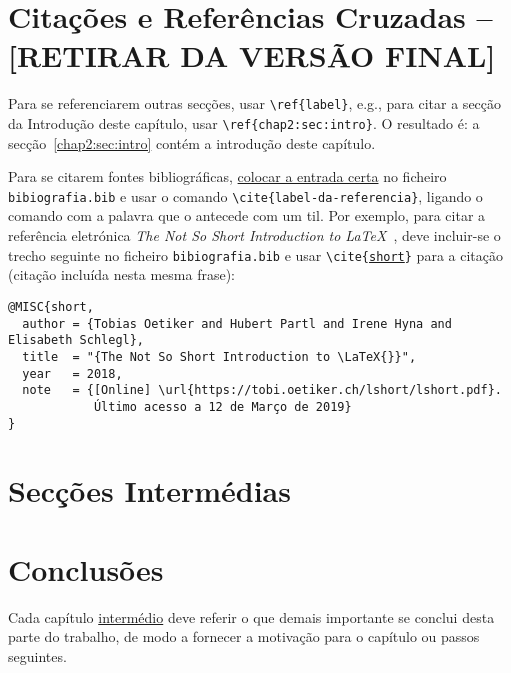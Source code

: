 \section{Citações e Referências Cruzadas -- [RETIRAR DA VERSÃO FINAL]}
\label{chap2:sec:citacoes}

Para se referenciarem outras secções, usar \texttt{\textbackslash{}ref\{label\}}, e.g., para citar a secção da Introdução deste capítulo, usar \texttt{\textbackslash{}ref\{chap2:sec:intro\}}. O resultado é: a secção~\ref{chap2:sec:intro} contém a introdução deste capítulo.

Para se citarem fontes bibliográficas, \underline{colocar a entrada certa} no ficheiro \texttt{bibiografia.bib} e usar o comando \texttt{\textbackslash{}cite\{label-da-referencia\}}, ligando o comando com a palavra que o antecede com um til. Por exemplo, para citar a referência eletrónica \emph{The Not So Short Introduction to \LaTeX{}}~\cite{short}, deve incluir-se o trecho seguinte no ficheiro \texttt{bibiografia.bib} e usar \texttt{\textbackslash{}cite\{\underline{short}\}} para a citação (citação incluída nesta mesma frase):
%
\begin{verbatim}
@MISC{short,
  author = {Tobias Oetiker and Hubert Partl and Irene Hyna and Elisabeth Schlegl},
  title  = "{The Not So Short Introduction to \LaTeX{}}",
  year   = 2018,
  note   = {[Online] \url{https://tobi.oetiker.ch/lshort/lshort.pdf}. 
            Último acesso a 12 de Março de 2019}
}
\end{verbatim}


\section{Secções Intermédias}
\label{chap2:sec:...}

\section{Conclusões}
\label{chap2:sec:concs}

Cada capítulo \underline{intermédio} deve referir o que demais importante se conclui desta parte do trabalho, de modo a fornecer a motivação para o capítulo ou passos seguintes.